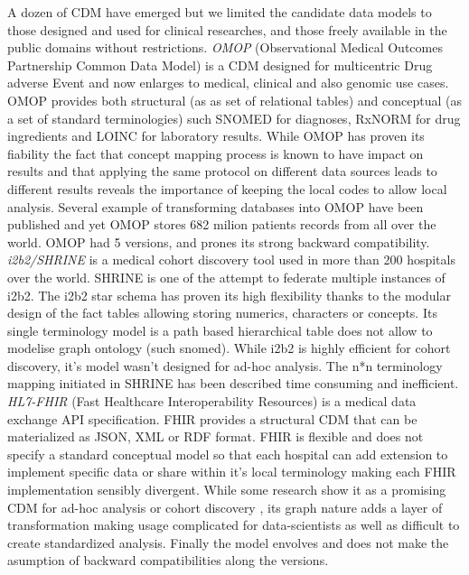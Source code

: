 \documentclass{aes2e}
\begin{document}
A dozen of CDM have emerged but we limited the candidate data models to those
designed and used for clinical researches, and those freely available in the
public domains without restrictions.
\emph{OMOP} (Observational Medical Outcomes Partnership Common Data Model) is
a CDM designed for multicentric Drug adverse Event and now enlarges to medical,
clinical and also genomic use cases. OMOP provides both structural (as as set
of relational tables) and conceptual (as a set of standard terminologies) such
SNOMED for diagnoses, RxNORM for drug ingredients and LOINC for laboratory
results. While OMOP has proven its fiability \cite{omop-eval} the fact that
concept mapping process is known to have impact on results
\cite{omop-concept-impact} and that applying the same protocol on different
data sources leads to different results \cite{omop-replicability} reveals the
importance of keeping the local codes to allow local analysis. Several example
of transforming databases into OMOP have been published
\cite{omop-german,omop-nashville} and yet OMOP stores 682 milion patients
records from all over the world\cite{omop-bigboy}. OMOP had 5 versions, and
prones its strong backward compatibility.
\emph{i2b2/SHRINE} is a medical cohort discovery tool used in more than 200
hospitals over the world. SHRINE is one of the attempt to federate multiple
instances of i2b2. The i2b2 star schema has proven its high flexibility thanks
to the modular design of the fact tables allowing storing numerics, characters
or concepts. Its single terminology model is a path based hierarchical table
does not allow to modelise graph ontology (such snomed). While i2b2 is highly
efficient for cohort discovery, it's model wasn't designed for ad-hoc analysis.
The n*n terminology mapping initiated in SHRINE has been described time
consuming and inefficient.
\emph{HL7-FHIR} (Fast Healthcare Interoperability Resources) is a medical
data exchange API specification. FHIR provides a structural CDM that can be
materialized as JSON, XML or RDF format. FHIR is flexible and does not specify
a standard conceptual model so that each hospital can add extension to
implement specific data or share within it's local terminology making each FHIR
implementation sensibly divergent. While some research show it as a promising
CDM for ad-hoc analysis \cite{fhir-google} or cohort discovery
\cite{fhir-paris}, its graph nature adds a layer of transformation making usage
complicated for data-scientists as well as difficult to create standardized
analysis. Finally the model envolves and does not make the asumption of
backward compatibilities along the versions.
\end{document}
